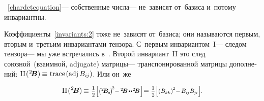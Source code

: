 \begin{otherlanguage}{russian}
\vspace{-0.4em}  ~\eqref{chardetequation}\:--- собственные числа\:--- не~зависят от~базиса и~потому инвариантны.

Коэффициенты~\eqref{invariants:2} тоже не~зависят от~базиса; они называются первым, вторым и~третьим инвариантами тензора.
С~первым инвариантом~${\mathrm{I}}$\:--- следом тензора\:--- мы уже встречались в~.
Второй инвариант~${\mathrm{II}}$ это след союзной~(взаимной, adjugate) матрицы\:--- транспонированной матрицы дополнений:
${\mathrm{II}\hspace{.16ex}(\hspace{.1ex}{^2\!\bm{B}}) \hspace{-0.12ex}
\equiv \hspace{.1ex} \operatorname{trace}\hspace{.16ex}{\hspace{-0.33ex} \left({\operatorname{adj}{B_{i\hspace{-0.1ex}j}}}\right)}}$.
Или он~же

\nopagebreak\vspace{-0.22em}\begin{equation*}
\mathrm{II}\hspace{.16ex}(\hspace{.1ex}{^2\!\bm{B}}) \hspace{-0.2ex}
\equiv \hspace{.12ex} \smalldisplaystyleonehalf \scalebox{0.84}{$\left[
\left( {^2\!\bm{B}}\tracedot\hspace{.1ex} \right)^{\!2} \hspace{-0.5ex}
- {^2\!\bm{B}} \hspace{-0.2ex} \dotdotp \hspace{-0.25ex} {^2\!\bm{B}} \hspace{.16ex}
\right]$} \hspace{-0.5ex}
= \smalldisplaystyleonehalf \scalebox{0.84}{$\left[
\left( B_{kk} \right)^{\hspace{-0.1ex}2} \hspace{-0.4ex}
- \hspace{-0.2ex} B_{i\hspace{-0.1ex}j} B_{\hspace{-0.1ex}j\hspace{-0.06ex}i} \hspace{.12ex}
\right]$}
\hspace{-0.25ex} .
\end{equation*}


\end{otherlanguage}

